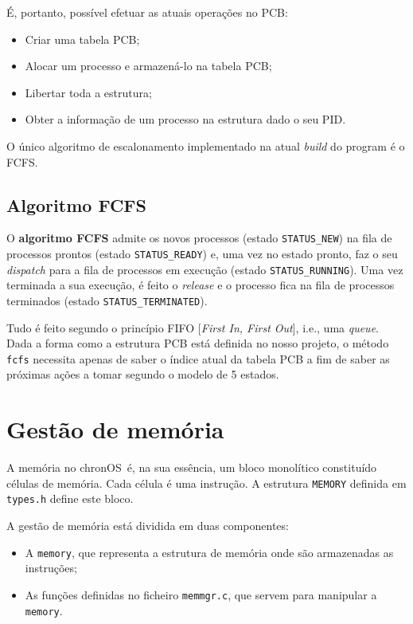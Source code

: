 \documentclass[a4paper,11pt,onecolumn,oneside]{article}
\newcommand{\chronOS}{\textsf{chronOS}}
\begin{document}
	É, portanto, possível efetuar as atuais operações no \ac{PCB}:
	\begin{itemize}
	    \item Criar uma tabela \ac{PCB};
	    \item Alocar um processo e armazená-lo na tabela \ac{PCB};
	    \item Libertar toda a estrutura;
	    \item Obter a informação de um processo na estrutura dado o seu \ac{PID}.
	\end{itemize}
	
	O único algoritmo de escalonamento implementado na atual \textit{build} do program é o \ac{FCFS}.
	
	
	\subsection{Algoritmo \ac{FCFS}}
	\label{ssec:process:fcfs}
	
	O \textbf{algoritmo \ac{FCFS}} admite os novos processos (estado \texttt{STATUS\_NEW}) na fila de processos prontos (estado \texttt{STATUS\_READY}) e, uma vez no estado pronto, faz o seu \textit{dispatch} para a fila de processos em execução (estado \texttt{STATUS\_RUNNING}). Uma vez terminada a sua execução, é feito o \textit{release} e o processo fica na fila de processos terminados (estado \texttt{STATUS\_TERMINATED}).
	
	Tudo é feito segundo o princípio FIFO [\textit{First In, First Out}], i.e., uma \textit{queue}. Dada a forma como a estrutura \ac{PCB} está definida no nosso projeto, o método \verb|fcfs| necessita apenas de saber o índice atual da tabela \ac{PCB} a fim de saber as próximas ações a tomar segundo o modelo de 5 estados.
	
	
	\section{Gestão de memória}
	\label{sec:memory}
	
	A memória no \chronOS~é, na sua essência, um bloco monolítico constituído células de memória. Cada célula é uma instrução. A estrutura \verb|MEMORY| definida em \texttt{types.h} define este bloco.
	
	A gestão de memória está dividida em duas componentes:
	\begin{itemize}
		\item A \verb|memory|, que representa a estrutura de memória onde são armazenadas as instruções;
		\item As funções definidas no ficheiro \verb|memmgr.c|, que servem para manipular a \verb|memory|.
	\end{itemize}
	
\end{document}

